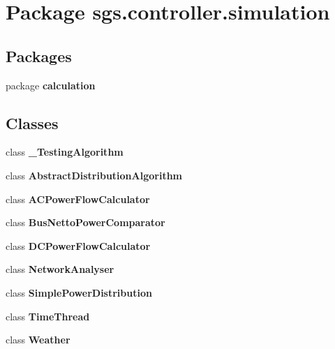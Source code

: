 \section{Package sgs.\-controller.\-simulation}
\label{namespacesgs_1_1controller_1_1simulation}
\subsection*{Packages}
\begin{DoxyCompactItemize}
\item 
package {\bf calculation}
\end{DoxyCompactItemize}
\subsection*{Classes}
\begin{DoxyCompactItemize}
\item 
class {\bf \-\_\-\-Testing\-Algorithm}
\item 
class {\bf Abstract\-Distribution\-Algorithm}
\item 
class {\bf A\-C\-Power\-Flow\-Calculator}
\item 
class {\bf Bus\-Netto\-Power\-Comparator}
\item 
class {\bf D\-C\-Power\-Flow\-Calculator}
\item 
class {\bf Network\-Analyser}
\item 
class {\bf Simple\-Power\-Distribution}
\item 
class {\bf Time\-Thread}
\item 
class {\bf Weather}
\end{DoxyCompactItemize}
